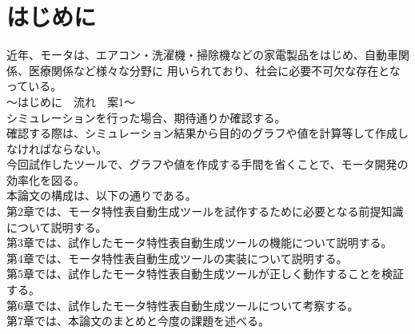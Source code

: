 \chapter{はじめに}\label{cha:Introduction}
近年、モータは、エアコン・洗濯機・掃除機などの家電製品をはじめ、自動車関係、医療関係など様々な分野に
用いられており\cite{モータ使用製品}、社会に必要不可欠な存在となっている。\\

～はじめに　流れ　案1～\\
シミュレーションを行った場合、期待通りか確認する。\\
確認する際は、シミュレーション結果から目的のグラフや値を計算等して作成しなければならない。\\
今回試作したツールで、グラフや値を作成する手間を省くことで、モータ開発の効率化を図る。\\


本論文の構成は、以下の通りである。\\
第2章では、モータ特性表自動生成ツールを試作するために必要となる前提知識について説明する。\\
第3章では、試作したモータ特性表自動生成ツールの機能について説明する。\\
第4章では、モータ特性表自動生成ツールの実装について説明する。\\
第5章では、試作したモータ特性表自動生成ツールが正しく動作することを検証する。\\
第6章では、試作したモータ特性表自動生成ツールについて考察する。\\
第7章では、本論文のまとめと今度の課題を述べる。\\

